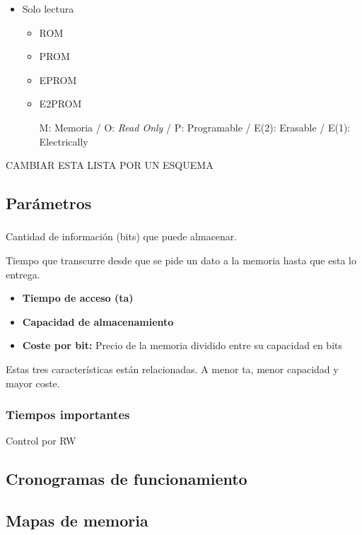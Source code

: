 \documentclass[a4paper]{book}
\begin{document}
\begin{itemize}
\begin{itemize}
\begin{itemize}
			   \item Solo lectura 
			   \begin{itemize}
					\item ROM
					\item PROM 
					\item EPROM 
					\item E2PROM
					
					M: Memoria
					/ O: \textit{Read Only}
					/ P: Programable
					/ E(2): Erasable
					/ E(1): Electrically
			   \end{itemize}
		  \end{itemize}
	 \end{itemize}
\end{itemize}

CAMBIAR ESTA LISTA POR UN ESQUEMA

\subsection{Parámetros}
\subsubsection{}
Cantidad de información (bits) que puede almacenar.


Tiempo que transcurre desde que se pide un dato a la memoria hasta que esta lo entrega.

\begin{itemize}
	 \item \textbf{Tiempo de acceso (ta)}
	 \item \textbf{Capacidad de almacenamiento}
	 \item \textbf{Coste por bit:} Precio de la memoria dividido entre su capacidad en bits
\end{itemize}

Estas tres características están relacionadas.
A menor ta, menor capacidad y mayor coste.

\subsubsection{Tiempos importantes}


Control por RW


\subsection{Cronogramas de funcionamiento}

\subsection{Mapas de memoria}
\end{document}
